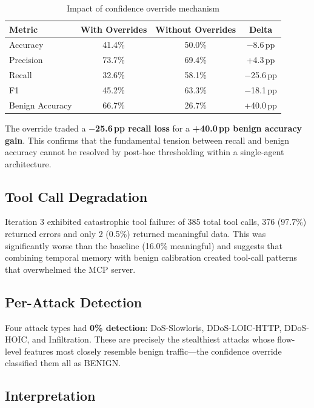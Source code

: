 \documentclass[12pt, a4paper, oneside]{report}
\newcommand{\metric}[1]{\textbf{#1}}
\begin{document}
\begin{table}[H]
\centering
\caption{Impact of confidence override mechanism}
\label{tab:override-impact}
\begin{tabular}{@{}lccc@{}}
\toprule
\textbf{Metric} & \textbf{With Overrides} & \textbf{Without Overrides} & \textbf{Delta} \\
\midrule
Accuracy        & 41.4\% & 50.0\% & $-$8.6\,pp \\
Precision       & 73.7\% & 69.4\% & +4.3\,pp \\
Recall          & 32.6\% & 58.1\% & $-$25.6\,pp \\
F1              & 45.2\% & 63.3\% & $-$18.1\,pp \\
Benign Accuracy & 66.7\% & 26.7\% & +40.0\,pp \\
\bottomrule
\end{tabular}
\end{table}

The override traded a \metric{$-$25.6\,pp recall loss} for a \metric{+40.0\,pp
benign accuracy gain}. This confirms that the fundamental tension between
recall and benign accuracy cannot be resolved by post-hoc thresholding within
a single-agent architecture.

\subsection{Tool Call Degradation}

Iteration 3 exhibited catastrophic tool failure: of 385 total tool calls,
376 (97.7\%) returned errors and only 2 (0.5\%) returned meaningful data.
This was significantly worse than the baseline (16.0\% meaningful) and suggests
that combining temporal memory with benign calibration created tool-call
patterns that overwhelmed the MCP server.

\subsection{Per-Attack Detection}

Four attack types had \textbf{0\% detection}: DoS-Slowloris, DDoS-LOIC-HTTP,
DDoS-HOIC, and Infiltration. These are precisely the stealthiest attacks whose
flow-level features most closely resemble benign traffic---the confidence
override classified them all as BENIGN.

\subsection{Interpretation}
\end{document}
